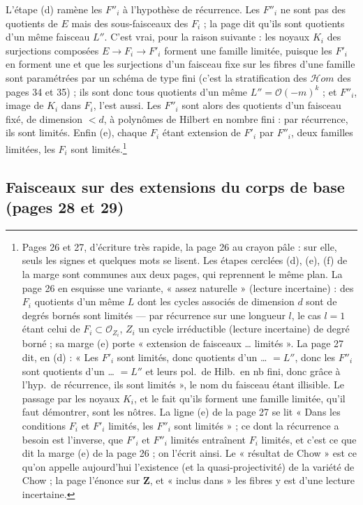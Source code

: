 \documentclass[11pt,a4paper]{article}
\begin{document}
L'étape (d) ramène les $F''_i$ à l'hypothèse de récurrence. Les $F''_i$ ne
sont pas des quotients de $E$ mais des sous-faisceaux des $F_i$ ; la page
dit qu'ils sont quotients d'un même faisceau $L''$. C'est vrai, pour la
raison suivante : les noyaux $K_i$ des surjections composées
$E \to F_i \to F'_i$ forment une famille limitée, puisque les $F'_i$ en
forment une et que les surjections d'un faisceau fixe sur les fibres d'une
famille sont paramétrées par un schéma de type fini (c'est la
stratification des $\mathcal{H}om$ des pages 34 et 35) ; ils sont
donc tous quotients d'un même $L'' = \mathcal{O}(-m)^{k}$ ; et $F''_i$, image
de $K_i$ dans $F_i$, l'est aussi. Les $F''_i$ sont alors des quotients d'un
faisceau fixé, de dimension $< d$, à polynômes de Hilbert en nombre fini :
par récurrence, ils sont limités. Enfin (e), chaque $F_i$ étant extension de
$F'_i$ par $F''_i$, deux familles limitées, les $F_i$ sont
limités.\footnote{Pages 26 et 27, d'écriture très rapide, la page 26 au
crayon pâle : sur elle, seuls les signes et quelques mots se lisent. Les
étapes cerclées (d), (e), (f) de la marge sont communes aux deux pages, qui
reprennent le même plan. La page 26 en esquisse une variante, « assez
naturelle » (lecture incertaine) : des $F_i$ quotients d'un même $L$ dont
les cycles associés de dimension $d$ sont de degrés bornés sont limités ---
par récurrence sur une longueur $l$, le cas $l = 1$ étant celui de
$F_i \subset \mathcal{O}_{Z_i}$, $Z_i$ un cycle irréductible (lecture
incertaine) de degré borné ; sa marge (e) porte « extension de faisceaux
… limités ». La page 27 dit, en (d) : « Les $F'_i$ sont limités, donc
quotients d'un … $= L''$, donc les $F''_i$ sont quotients d'un … $= L''$
et leurs pol.\ de Hilb.\ en nb fini, donc grâce à l'hyp.\ de récurrence,
ils sont limités », le nom du faisceau étant illisible. Le passage par les
noyaux $K_i$, et le fait qu'ils forment une famille limitée, qu'il faut
démontrer, sont les nôtres. La ligne (e) de la page 27 se lit « Dans les
conditions $F_i$ et $F'_i$ limités, les $F''_i$ sont limités » ; ce dont la
récurrence a besoin est l'inverse, que $F'_i$ et $F''_i$ limités
entraînent $F_i$ limités, et c'est ce que dit la marge (e) de la page 26 ;
on l'écrit ainsi. Le « résultat de Chow » est ce qu'on appelle aujourd'hui
l'existence (et la quasi-projectivité) de la variété de Chow ; la page
l'énonce sur $\mathbf{Z}$, et « inclus dans » les fibres y est d'une lecture
incertaine.}

\subsection*{Faisceaux sur des extensions du corps de base (pages 28 et 29)}
\end{document}

